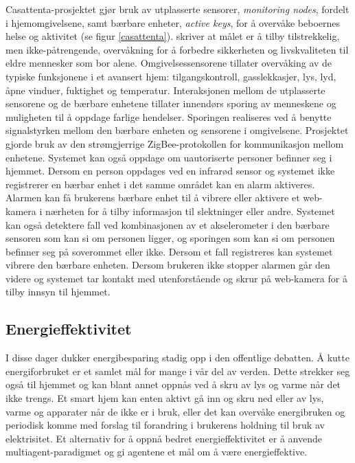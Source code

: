 Casattenta-prosjektet gjør bruk av utplasserte sensorer, \emph{monitoring nodes}, fordelt i hjemomgivelsene, samt bærbare enheter, \emph{active keys}, for å overvåke beboernes helse og aktivitet (se figur \ref{casattenta}). \citet{casattenta} skriver at målet er å tilby tilstrekkelig, men ikke-påtrengende, overvåkning for å forbedre sikkerheten og livskvaliteten til eldre mennesker som bor alene. Omgivelsessensorene tillater overvåking av de typiske funksjonene i et avansert hjem: tilgangskontroll, gasslekkasjer, lys, lyd, åpne vinduer, fuktighet og temperatur. Interaksjonen mellom de utplasserte sensorene og de bærbare enhetene tillater innendørs sporing av menneskene og muligheten til å oppdage farlige hendelser. Sporingen realiseres ved å benytte signalstyrken mellom den bærbare enheten og sensorene i omgivelsene. Prosjektet gjorde bruk av den strømgjerrige ZigBee-protokollen for kommunikasjon mellom enhetene. Systemet kan også oppdage om uautoriserte personer befinner seg i hjemmet. Dersom en person oppdages ved en infrarød sensor og systemet ikke registrerer en bærbar enhet i det samme området kan en alarm aktiveres. Alarmen kan få brukerens bærbare enhet til å vibrere eller aktivere et web-kamera i nærheten for å tilby informasjon til slektninger eller andre. Systemet kan også detektere fall ved kombinasjonen av et akselerometer i den bærbare sensoren som kan si om personen ligger, og sporingen som kan si om personen befinner seg på soverommet eller ikke. Dersom et fall registreres kan systemet vibrere den bærbare enheten. Dersom brukeren ikke stopper alarmen går den videre og systemet tar kontakt med utenforstående og skrur på web-kamera for å tilby innsyn til hjemmet.

\subsection*{Energieffektivitet}
I disse dager dukker energibesparing stadig opp i den offentlige debatten. Å kutte energiforbruket er et samlet mål for mange i vår del av verden. Dette strekker seg også til hjemmet og kan blant annet oppnås ved å skru av lys og varme når det ikke trengs. Et smart hjem kan enten aktivt gå inn og skru ned eller av lys, varme og apparater når de ikke er i bruk, eller det kan overvåke energibruken og periodisk komme med forslag til forandring i brukerens holdning til bruk av elektrisitet. Et alternativ for å oppnå bedret energieffektivitet er å anvende multiagent-paradigmet og gi agentene et mål om å være energieffektive.

